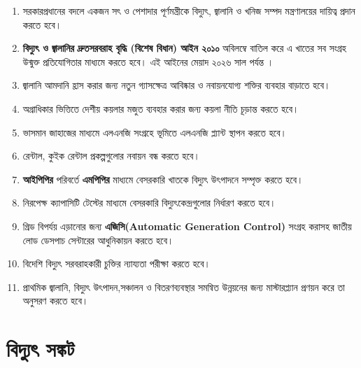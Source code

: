 \documentclass[11pt]{article}
\begin{document}
\begin{enumerate}
\item সরকারপ্রধানের বদলে একজন সৎ ও পেশাদার পূর্ণমন্ত্রীকে বিদ্যুৎ, জ্বালানি ও
খনিজ সম্পদ মন্ত্রণালয়ের দায়িত্ব প্রদান করতে হবে।
\item \textbf{বিদ্যুৎ ও জ্বালানির দ্রুতসরবরাহ বৃদ্ধি (বিশেষ বিধান) আইন ২০১০} অবিলম্বে
বাতিল করে এ খাতের সব সংগ্রহ উন্মুক্ত প্রতিযোগিতার মাধ্যমে করতে হবে।
এই আইনের মেয়াদ ২০২৬ সাল পর্যন্ত ।
\item জ্বালানি আমদানি হ্রাস করার জন্য নতুন গ্যাসক্ষেত্র আবিষ্কার ও নবায়নযোগ্য শক্তির
ব্যবহার বাড়াতে হবে।
\item অগ্রাধিকার ভিত্তিতে দেশীয় কয়লার মজুত ব্যবহার করার জন্য কয়লা নীতি চূড়ান্ত করতে হবে।
\item ভাসমান জাহাজের মাধ্যমে এলএনজি সংগ্রহে ভূমিতে এলএনজি প্ল্যান্ট স্থাপন করতে হবে।
\item রেন্টাল, কুইক রেন্টাল প্রকল্পগুলোর নবায়ন বন্ধ করতে হবে।
\item \textbf{আইপিপির} পরিবর্তে \textbf{এমপিপির} মাধ্যমে বেসরকারি খাতকে বিদ্যুৎ উৎপাদনে সম্পৃক্ত করতে হবে।
\item নিরপেক্ষ ক্যাপাসিটি টেস্টের মাধ্যমে বেসরকারি বিদ্যুৎকেন্দ্রগুলোর নির্ধারণ করতে হবে।
\item গ্রিড বিপর্যয় এড়ানোর জন্য \textbf{এজিসি(Automatic Generation Control)} সংগ্রহ করাসহ জাতীয় লোড
ডেসপাচ সেন্টারের আধুনিকায়ন করতে হবে।
\item বিদেশি বিদ্যুৎ সরবরাহকারী চুক্তির ন্যায্যতা পরীক্ষা করতে হবে।
\item প্রাথমিক জ্বালানি, বিদ্যুৎ উৎপাদন,সঞ্চালন ও বিতরণব্যবস্থার সমন্বিত উন্নয়নের জন্য মাস্টারপ্ল্যান
প্রণয়ন করে তা অনুসরণ করতে হবে।
\end{enumerate}

\section{বিদ্যুৎ সঙ্কট}
\label{sec:org567d7c8}
\end{document}
